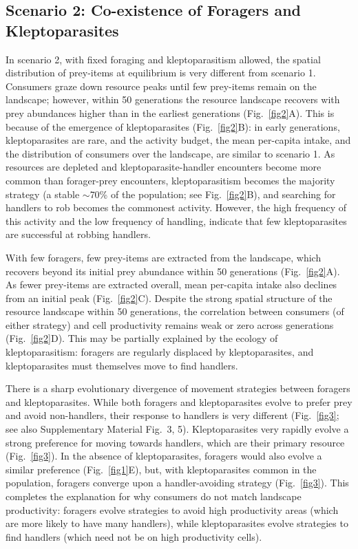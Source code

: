 \begin{refsection}[sorting=nyt]
\subsection*{Scenario 2: Co-existence of Foragers and Kleptoparasites}

In scenario 2, with fixed foraging and kleptoparasitism allowed, the spatial distribution of prey-items at equilibrium is very different from scenario 1.
Consumers graze down resource peaks until few prey-items remain on the landscape; however, within 50 generations the resource landscape recovers with prey abundances higher than in the earliest generations (Fig.~\ref{fig2}A).
This is because of the emergence of kleptoparasites (Fig.~\ref{fig2}B): in early generations, kleptoparasites are rare, and the activity budget, the mean per-capita intake, and the distribution of consumers over the landscape, are similar to scenario 1.
As resources are depleted and kleptoparasite-handler encounters become more common than forager-prey encounters, kleptoparasitism becomes the majority strategy (a stable $\sim$70\% of the population; see Fig.~\ref{fig2}B), and searching for handlers to rob becomes the commonest activity.
However, the high frequency of this activity and the low frequency of handling, indicate that few kleptoparasites are successful at robbing handlers.

With few foragers, few prey-items are extracted from the landscape, which recovers beyond its initial prey abundance within 50 generations (Fig.~\ref{fig2}A).
As fewer prey-items are extracted overall, mean per-capita intake also declines from an initial peak (Fig.~\ref{fig2}C).
Despite the strong spatial structure of the resource landscape within 50 generations, the correlation between consumers (of either strategy) and cell productivity remains weak or zero across generations (Fig.~\ref{fig2}D).
This may be partially explained by the ecology of kleptoparasitism: foragers are regularly displaced by kleptoparasites, and kleptoparasites must themselves move to find handlers.

There is a sharp evolutionary divergence of movement strategies between foragers and kleptoparasites.
While both foragers and kleptoparasites evolve to prefer prey and avoid non-handlers, their response to handlers is very different (Fig.~\ref{fig3}; see also Supplementary Material Fig.~3, 5).
Kleptoparasites very rapidly evolve a strong preference for moving towards handlers, which are their primary resource (Fig.~\ref{fig3}).
In the absence of kleptoparasites, foragers would also evolve a similar preference (Fig.~\ref{fig1}E), but, with kleptoparasites common in the population, foragers converge upon a handler-avoiding strategy (Fig.~\ref{fig3}).
This completes the explanation for why consumers do not match landscape productivity: foragers evolve strategies to avoid high productivity areas (which are more likely to have many handlers), while kleptoparasites evolve strategies to find handlers (which need not be on high productivity cells).


\end{refsection}
